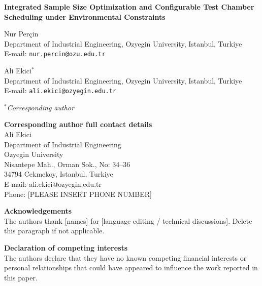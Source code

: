 \documentclass[11pt]{article}
\begin{document}
\begin{center}
{\Large \textbf{Integrated Sample Size Optimization and Configurable Test Chamber Scheduling under Environmental Constraints}}
\end{center}

\vspace{1.5em}

\noindent
Nur Per\c{c}in\\
Department of Industrial Engineering, Ozyegin University, Istanbul, Turkiye\\
E-mail: \texttt{nur.percin@ozu.edu.tr}

\vspace{1em}

\noindent
Ali Ekici$^{\ast}$\\
Department of Industrial Engineering, Ozyegin University, Istanbul, Turkiye\\
E-mail: \texttt{ali.ekici@ozyegin.edu.tr}

\vspace{1em}

\noindent
$^{\ast}$\textit{Corresponding author}

\vspace{1.5em}

\noindent\textbf{Corresponding author full contact details}\\
Ali Ekici\\
Department of Industrial Engineering\\
Ozyegin University\\
Nisantepe Mah., Orman Sok., No: 34--36\\
34794 Cekmekoy, Istanbul, Turkiye\\
E-mail: ali.ekici@ozyegin.edu.tr\\
Phone: [PLEASE INSERT PHONE NUMBER]

\vspace{1.5em}

\noindent\textbf{Acknowledgements}\\
[Optional] The authors thank [names] for [language editing / technical discussions]. Delete this paragraph if not applicable.

\vspace{1.5em}

\noindent\textbf{Declaration of competing interests}\\
The authors declare that they have no known competing financial interests or personal relationships that could have appeared to influence the work reported in this paper.
\end{document}
